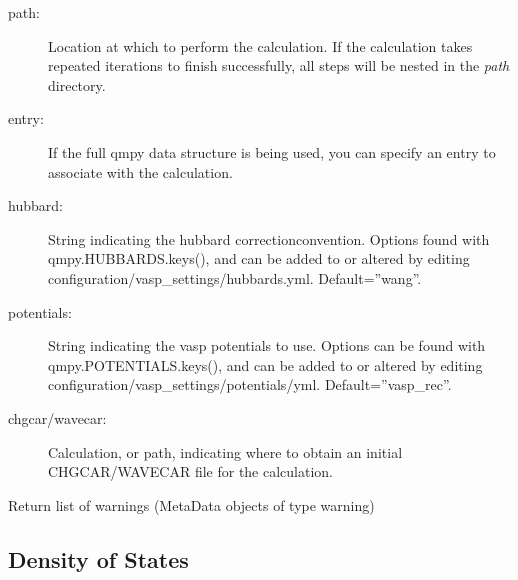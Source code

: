 \documentclass[letterpaper,10pt,english]{sphinxmanual}
\begin{document}
\begin{fulllineitems}
\begin{fulllineitems}
\begin{description}
\begin{description}
\item[{path: }] \leavevmode
Location at which to perform the calculation. If the
calculation takes repeated iterations to finish successfully,
all steps will be nested in the \emph{path} directory.

\item[{entry:}] \leavevmode
If the full qmpy data structure is being used, you can specify
an entry to associate with the calculation.

\item[{hubbard:}] \leavevmode
String indicating the hubbard correctionconvention. Options 
found with qmpy.HUBBARDS.keys(), and can be added to or
altered by editing configuration/vasp\_settings/hubbards.yml.
Default=''wang''.

\item[{potentials:}] \leavevmode
String indicating the vasp potentials to use. Options can be 
found with qmpy.POTENTIALS.keys(), and can be added to or
altered by editing configuration/vasp\_settings/potentials/yml.
Default=''vasp\_rec''.

\item[{chgcar/wavecar:}] \leavevmode
Calculation, or path, indicating where to obtain an initial
CHGCAR/WAVECAR file for the calculation.

\end{description}

\end{description}

\end{fulllineitems}


\begin{fulllineitems}
\label{models:qmpy.Calculation.warning_objects}
Return list of warnings (MetaData objects of type warning)

\end{fulllineitems}


\end{fulllineitems}



\subsection{Density of States}
\label{models:density-of-states}
\end{document}
